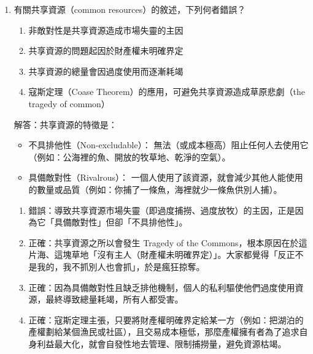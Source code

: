 \documentclass[12pt, a4paper]{article}
\begin{document}
\begin{enumerate}
    \item 有關共享資源（common resources）的敘述，下列何者錯誤？
    \begin{enumerate}[label=\Alph*.]
        \item 非敵對性是共享資源造成市場失靈的主因
        \item 共享資源的問題起因於財產權未明確界定
        \item 共享資源的總量會因過度使用而逐漸耗竭
        \item 寇斯定理（Coase Theorem）的應用，可避免共享資源造成草原悲劇（the tragedy of common）
    \end{enumerate}
    解答：共享資源的特徵是：
    \begin{itemize}
        \item 不具排他性（Non-excludable）： 無法（或成本極高）阻止任何人去使用它（例如：公海裡的魚、開放的牧草地、乾淨的空氣）。
        \item 具備敵對性（Rivalrous）： 一個人使用了該資源，就會減少其他人能使用的數量或品質（例如：你捕了一條魚，海裡就少一條魚供別人捕）。
    \end{itemize}
    \begin{enumerate}[label=\Alph*.]
        \item 錯誤：導致共享資源市場失靈（即過度捕撈、過度放牧）的主因，正是因為它「具備敵對性」但卻「不具排他性」。
        \item 正確：共享資源之所以會發生 Tragedy of the Commons，根本原因在於這片海、這塊草地「沒有主人（財產權未明確界定）」。大家都覺得「反正不是我的，我不抓別人也會抓」，於是瘋狂掠奪。
        \item 正確：因為具備敵對性且缺乏排他機制，個人的私利驅使他們過度使用資源，最終導致總量耗竭，所有人都受害。
        \item 正確：寇斯定理主張，只要將財產權明確界定給某一方（例如：把湖泊的產權劃給某個漁民或社區），且交易成本極低，那麼產權擁有者為了追求自身利益最大化，就會自發性地去管理、限制捕撈量，避免資源枯竭。
    \end{enumerate}



\end{enumerate}
\end{document}
